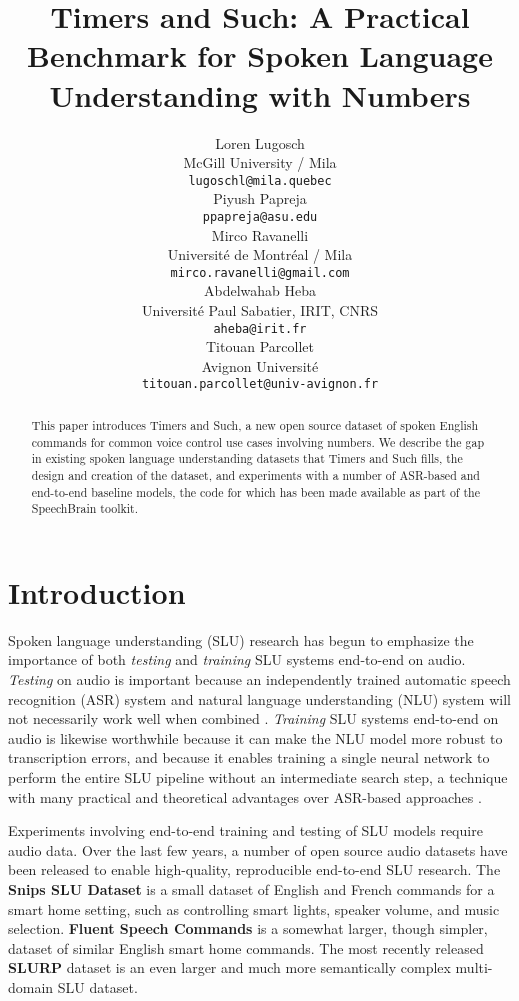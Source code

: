 \documentclass{article}
\title{Timers and Such: A Practical Benchmark for Spoken Language Understanding with Numbers}
\author{Loren Lugosch \\
  McGill University / Mila\\
  \texttt{lugoschl@mila.quebec} \\
\And
Piyush Papreja \\
   \texttt{ppapreja@asu.edu} \\
   \AND
   Mirco Ravanelli \\
   Université de Montréal / Mila\\
   \texttt{mirco.ravanelli@gmail.com} \\
   \And
   Abdelwahab Heba \\
   Université Paul Sabatier, IRIT, CNRS \\
   \texttt{aheba@irit.fr} \\
   \And
   Titouan Parcollet \\
   Avignon Université \\
   \texttt{titouan.parcollet@univ-avignon.fr} \\
}
\begin{document}
\maketitle

\begin{abstract}
  This paper introduces Timers and Such, a new open source dataset of spoken English commands for common voice control use cases involving numbers. We describe the gap in existing spoken language understanding datasets that Timers and Such fills, the design and creation of the dataset, and experiments with a number of ASR-based and end-to-end baseline models, the code for which has been made available as part of the SpeechBrain toolkit.
\end{abstract}

\section{Introduction}\label{intro}

Spoken language understanding (SLU) research has begun to emphasize the importance of both \textit{testing} and \textit{training} SLU systems end-to-end on audio. 
\textit{Testing} on audio is important because an independently trained automatic speech recognition (ASR) system and natural language understanding (NLU) system will not necessarily work well when combined \cite{hakkani2006beyond, saade2018spoken}. \textit{Training} SLU systems end-to-end on audio is likewise worthwhile because it can make the NLU model more robust to transcription errors, and because it enables training a single neural network to perform the entire SLU pipeline without an intermediate search step, a technique with many practical and theoretical advantages over ASR-based approaches \cite{Serdyuk2018}. 

Experiments involving end-to-end training and testing of SLU models require audio data. Over the last few years, a number of open source audio datasets have been released to enable high-quality, reproducible end-to-end SLU research. The \textbf{Snips SLU Dataset} \cite{saade2018spoken} is a small dataset of English and French commands for a smart home setting, such as controlling smart lights, speaker volume, and music selection. \textbf{Fluent Speech Commands} \cite{lugosch2019speech} is a somewhat larger, though simpler, dataset of similar English smart home commands. The most recently released \textbf{SLURP} dataset \cite{slurp} is an even larger and much more semantically complex multi-domain SLU dataset. 
\end{document}
